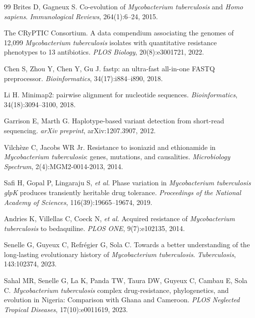\documentclass[11pt,a4paper]{article}
\begin{document}
\begin{thebibliography}{99}
	Brites D, Gagneux S.
	Co-evolution of \textit{Mycobacterium tuberculosis} and \textit{Homo sapiens}.
	\textit{Immunological Reviews}, 264(1):6--24, 2015.

	The CRyPTIC Consortium.
	A data compendium associating the genomes of 12{,}099 \textit{Mycobacterium
		tuberculosis} isolates with quantitative resistance phenotypes to 13
	antibiotics.
	\textit{PLOS Biology}, 20(8):e3001721, 2022.

	Chen S, Zhou Y, Chen Y, Gu J.
	fastp: an ultra-fast all-in-one FASTQ preprocessor.
	\textit{Bioinformatics}, 34(17):i884--i890, 2018.

	Li H.
	Minimap2: pairwise alignment for nucleotide sequences.
	\textit{Bioinformatics}, 34(18):3094--3100, 2018.

	Garrison E, Marth G.
	Haplotype-based variant detection from short-read sequencing.
	\textit{arXiv preprint}, arXiv:1207.3907, 2012.

	Vilch\`eze C, Jacobs WR Jr.
	Resistance to isoniazid and ethionamide in \textit{Mycobacterium tuberculosis}:
	genes, mutations, and causalities.
	\textit{Microbiology Spectrum}, 2(4):MGM2-0014-2013, 2014.

	Safi H, Gopal P, Lingaraju S, \textit{et al.}
	Phase variation in \textit{Mycobacterium tuberculosis} \textit{glpK} produces
	transiently heritable drug tolerance.
	\textit{Proceedings of the National Academy of Sciences}, 116(39):19665--19674, 2019.

	Andries K, Villellas C, Coeck N, \textit{et al.}
	Acquired resistance of \textit{Mycobacterium tuberculosis} to bedaquiline.
	\textit{PLOS ONE}, 9(7):e102135, 2014.


	Senelle G, Guyeux C, Refr\'egier G, Sola C.
	Towards a better understanding of the long-lasting evolutionary history of
	\textit{Mycobacterium tuberculosis}.
	\textit{Tuberculosis}, 143:102374, 2023.

	Sahal MR, Senelle G, La K, Panda TW, Taura DW, Guyeux C, Cambau E, Sola C.
	\textit{Mycobacterium tuberculosis} complex drug-resistance, phylogenetics,
	and evolution in Nigeria: Comparison with Ghana and Cameroon.
	\textit{PLOS Neglected Tropical Diseases}, 17(10):e0011619, 2023.


\end{thebibliography}
\end{document}
